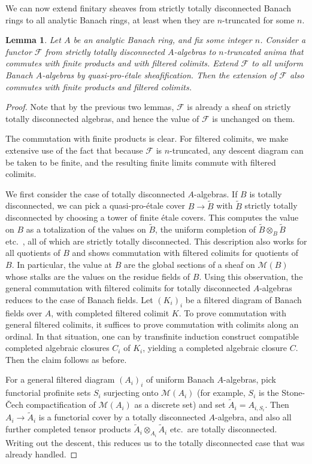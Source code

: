 \documentclass[11pt]{amsart}
\numberwithin{equation}{section}
\numberwithin{theorem}{section}
\newtheorem{lemma}[theorem]{Lemma}
\theoremstyle{definition}
\begin{document}
We can now extend finitary sheaves from strictly totally disconnected Banach rings to all analytic Banach rings, at least when they are $n$-truncated for some $n$.

\begin{lemma}\label{lem:quasiproetalecohomfiltcolim} Let $A$ be an analytic Banach ring, and fix some integer $n$. Consider a functor $\mathcal F$ from strictly totally disconnected $A$-algebras to $n$-truncated anima that commutes with finite products and with filtered colimits. Extend $\mathcal F$ to all uniform Banach $A$-algebras by quasi-pro-\'etale sheafification. Then the extension of $\mathcal F$ also commutes with finite products and filtered colimits.
\end{lemma}

\begin{proof} Note that by the previous two lemmas, $\mathcal F$ is already a sheaf on strictly totally disconnected algebras, and hence the value of $\mathcal F$ is unchanged on them.

The commutation with finite products is clear. For filtered colimits, we make extensive use of the fact that because $\mathcal F$ is $n$-truncated, any descent diagram can be taken to be finite, and the resulting finite limits commute with filtered colimits.

We first consider the case of totally disconnected $A$-algebras. If $B$ is totally disconnected, we can pick a quasi-pro-\'etale cover $B\to \tilde{B}$ with $\tilde{B}$ strictly totally disconnected by choosing a tower of finite \'etale covers. This computes the value on $B$ as a totalization of the values on $\tilde{B}$, the uniform completion of $\tilde{B}\otimes_B \tilde{B}$ etc.~, all of which are strictly totally disconnected. This description also works for all quotients of $B$ and shows commutation with filtered colimits for quotients of $B$. In particular, the value at $B$ are the global sections of a sheaf on $\mathcal M(B)$ whose stalks are the values on the residue fields of $B$. Using this observation, the general commutation with filtered colimits for totally disconnected $A$-algebras reduces to the case of Banach fields. Let $(K_i)_i$ be a filtered diagram of Banach fields over $A$, with completed filtered colimit $K$. To prove commutation with general filtered colimits, it suffices to prove commutation with colimits along an ordinal. In that situation, one can by transfinite induction construct compatible completed algebraic closures $C_i$ of $K_i$, yielding a completed algebraic closure $C$. Then the claim follows as before.

For a general filtered diagram $(A_i)_i$ of uniform Banach $A$-algebras, pick functorial profinite sets $S_i$ surjecting onto $\mathcal M(A_i)$ (for example, $S_i$ is the Stone-\v{C}ech compactification of $\mathcal M(A_i)$ as a discrete set) and set $\tilde{A}_i = A_{i,S_i}$. Then $A_i\to \tilde{A}_i$ is a functorial cover by a totally disconnected $A$-algebra, and also all further completed tensor products $\tilde{A}_i\otimes_{A_i} \tilde{A}_i$ etc.~are totally disconnected. Writing out the descent, this reduces us to the totally disconnected case that was already handled.
\end{proof}
\end{document}
